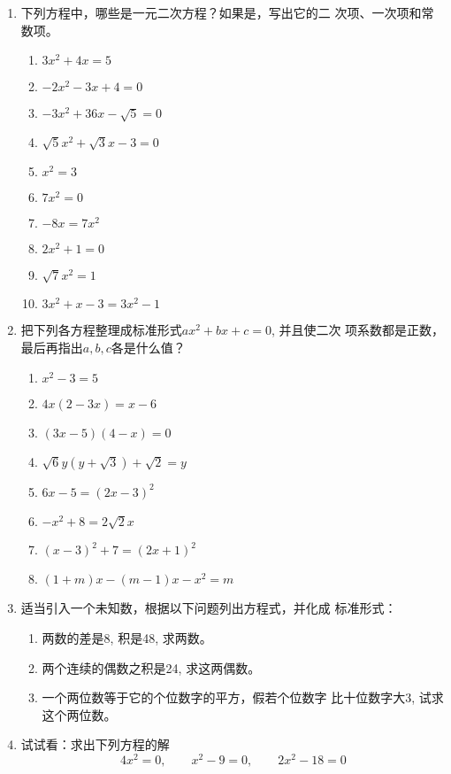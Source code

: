 \begin{ex}
\begin{enumerate}
    \item 
    下列方程中，哪些是一元二次方程？如果是，写出它的二
    次项、一次项和常数项。
    \begin{multicols}{2}
        \begin{enumerate}
       \item $3x^2+4x=5$
       \item $-2x^2-3x+4=0$
       \item $-3x^2+36x-\sqrt{5}=0$
       \item  $\sqrt{5}x^2+\sqrt{3}x-3=0$
           \item  $x^2=3$
       \item  $7x^2=0$
           \item  $ -8x=7x^2$
           \item  $2x^2+1=0$
       \item  $\sqrt{7}x^2=1$ 
       \item  $3x^2+x-3=3x^2-1$
   \end{enumerate}
    \end{multicols}
   
   \item 把下列各方程整理成标准形式$ax^2+bx+c=0$, 并且使二次
    项系数都是正数，最后再指出$a,b,c$各是什么值？
    \begin{multicols}{2}
  \begin{enumerate}
    \item  $x^2-3=5$
    \item $4x(2-3x)=x-6$
    \item $(3x-5)(4-x)=0$
    \item $\sqrt{6}y(y+\sqrt{3})+\sqrt{2}=y$
    \item $6x-5=(2x-3)^2$ 
    \item $-x^2+8=2\sqrt{2}x$
        \item $(x-3)^2+7=(2x+1)^2$
        \item $(1+m)x- (m-1)x-x^2=m$
\end{enumerate}      
    \end{multicols}

    \item 适当引入一个未知数，根据以下问题列出方程式，并化成
    标准形式：
    \begin{enumerate}
        \item 两数的差是8, 积是48, 求两数。
        \item 两个连续的偶数之积是24, 求这两偶数。
        \item 一个两位数等于它的个位数字的平方，假若个位数字
    比十位数字大3, 试求这个两位数。
    \end{enumerate}
\item 试试看：求出下列方程的解
\[4x^2=0,\qquad  x^2-9=0,\qquad 2x^2-18=0\]
\end{enumerate}    
\end{ex}

